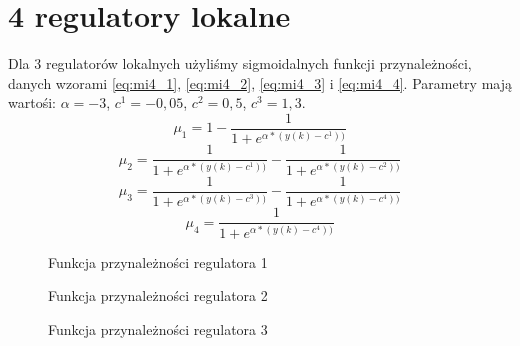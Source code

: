 \section{4 regulatory lokalne}
Dla 3 regulatorów lokalnych użyliśmy sigmoidalnych funkcji przynależności, danych wzorami \ref{eq:mi4_1}, \ref{eq:mi4_2}, \ref{eq:mi4_3} i \ref{eq:mi4_4}. Parametry mają wartośi: $\alpha = -3$, $c^1 = -0,05$, $c^2=0,5$, $c^3=1,3$.
\begin{equation} \label{eq:mi4_1}
\mu_1 = 1 - \frac{1}{1+e^{\alpha * (y(k)-c^1))}}
\end{equation}
\begin{equation} \label{eq:mi4_2}
\mu_2 = \frac{1}{1+e^{\alpha * (y(k)-c^1))}} - \frac{1}{1+e^{\alpha * (y(k)-c^2))}}
\end{equation}
\begin{equation} \label{eq:mi4_3}
\mu_3 = \frac{1}{1+e^{\alpha * (y(k)-c^3))}} - \frac{1}{1+e^{\alpha * (y(k)-c^4))}}
\end{equation}
\begin{equation} \label{eq:mi4_4}
\mu_4 = \frac{1}{1+e^{\alpha * (y(k)-c^4))}}
\end{equation}

\begin{figure}[H]
\centering
{}
\caption{Funkcja przynależności regulatora 1}
\label{fig:mi4_1}
\end{figure}

\begin{figure}[H]
\centering
{}
\caption{Funkcja przynależności regulatora 2}
\label{fig:mi4_2}
\end{figure}

\begin{figure}[H]
\centering
{}
\caption{Funkcja przynależności regulatora 3}
\label{fig:mi4_3}
\end{figure}

